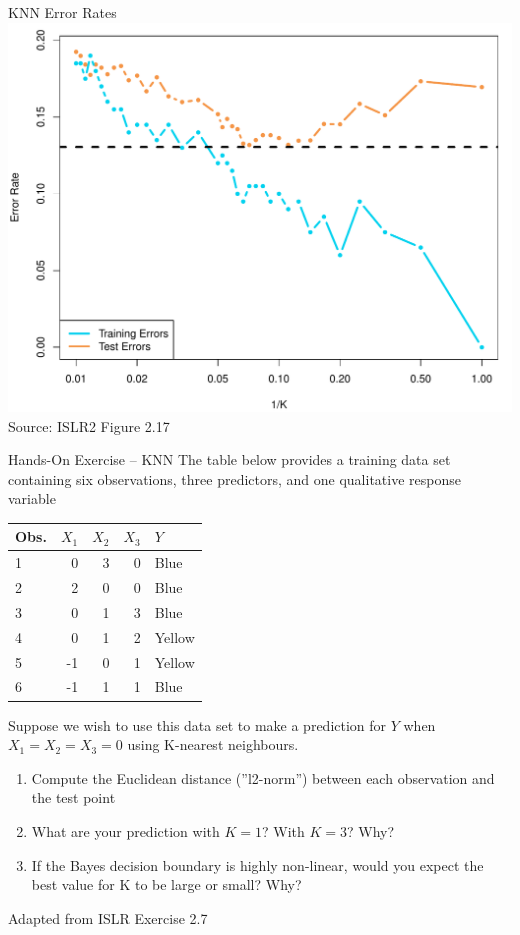 \documentclass[ignorenonframetext,xcolor=x11names]{beamer}
\begin{document}
\begin{frame}{KNN Error Rates}
\centering
\includegraphics[width=.8\textwidth]{Figures_Chapters_1-6/Chapter2/2_17.pdf} \\
\vspace{3mm}
\scriptsize Source: ISLR2 Figure 2.17
\end{frame}

\begin{frame}{Hands-On Exercise -- KNN}
\small
The table below provides a training data set containing six observations, three predictors, and one qualitative response variable

\begin{center}
\footnotesize
\begin{tabular}{l|r|r|r|l} \hline
Obs. & $X_1$ & $X_2$ & $X_3$ & $Y$ \\ \hline
1 & 0 & 3 & 0 & Blue \\
2 & 2 & 0 & 0 & Blue \\
3 & 0 & 1 & 3 & Blue \\
4 & 0 & 1 & 2 & Yellow \\
5 & -1 & 0 & 1 & Yellow \\
6 & -1 & 1 & 1 & Blue \\ \hline
\end{tabular}
\end{center}

Suppose we wish to use this data set to make a prediction for $Y$ when $X_1=X_2=X_3=0$ using K-nearest neighbours.

\begin{enumerate}
  \item Compute the Euclidean distance (''l2-norm'') between each observation and the test point
  \item What are your prediction with $K=1$? With $K=3$? Why?
  \item If the Bayes decision boundary is highly non-linear, would you expect the best value for K to be large or small? Why?
\end{enumerate}

\scriptsize Adapted from ISLR Exercise 2.7
\end{frame}
\end{document}
